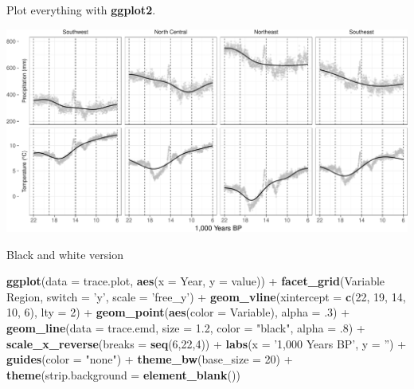 \documentclass[11pt,]{tufte-handout}
\newenvironment{Shaded}{}{}
\newcommand{\KeywordTok}[1]{\textcolor[rgb]{0.00,0.44,0.13}{\textbf{{#1}}}}
\newcommand{\DataTypeTok}[1]{\textcolor[rgb]{0.56,0.13,0.00}{{#1}}}
\newcommand{\DecValTok}[1]{\textcolor[rgb]{0.25,0.63,0.44}{{#1}}}
\newcommand{\FloatTok}[1]{\textcolor[rgb]{0.25,0.63,0.44}{{#1}}}
\newcommand{\StringTok}[1]{\textcolor[rgb]{0.25,0.44,0.63}{{#1}}}
\newcommand{\NormalTok}[1]{{#1}}
\begin{document}
Plot everything with \textbf{ggplot2}.

\begin{marginfigure}
\includegraphics{climate-analysis_files/figure-latex/bwplot-1} \caption[Black and white version]{Black and white version}\label{fig:bwplot}
\end{marginfigure}

\begin{Shaded}
\begin{Highlighting}[]
\KeywordTok{ggplot}\NormalTok{(}\DataTypeTok{data =} \NormalTok{trace.plot, }\KeywordTok{aes}\NormalTok{(}\DataTypeTok{x =} \NormalTok{Year, }\DataTypeTok{y =} \NormalTok{value)) +}
\StringTok{  }\KeywordTok{facet_grid}\NormalTok{(Variable ~}\StringTok{ }\NormalTok{Region, }\DataTypeTok{switch =} \StringTok{'y'}\NormalTok{, }\DataTypeTok{scale =} \StringTok{'free_y'}\NormalTok{) +}
\StringTok{  }\KeywordTok{geom_vline}\NormalTok{(}\DataTypeTok{xintercept =} \KeywordTok{c}\NormalTok{(}\DecValTok{22}\NormalTok{, }\DecValTok{19}\NormalTok{, }\DecValTok{14}\NormalTok{, }\DecValTok{10}\NormalTok{, }\DecValTok{6}\NormalTok{), }\DataTypeTok{lty =} \DecValTok{2}\NormalTok{) +}
\StringTok{  }\KeywordTok{geom_point}\NormalTok{(}\KeywordTok{aes}\NormalTok{(}\DataTypeTok{color =} \NormalTok{Variable), }\DataTypeTok{alpha =} \NormalTok{.}\DecValTok{3}\NormalTok{) +}
\StringTok{  }\KeywordTok{geom_line}\NormalTok{(}\DataTypeTok{data =} \NormalTok{trace.emd, }\DataTypeTok{size =} \FloatTok{1.2}\NormalTok{, }\DataTypeTok{color =} \StringTok{"black"}\NormalTok{, }\DataTypeTok{alpha =} \NormalTok{.}\DecValTok{8}\NormalTok{) +}
\StringTok{  }\KeywordTok{scale_x_reverse}\NormalTok{(}\DataTypeTok{breaks =} \KeywordTok{seq}\NormalTok{(}\DecValTok{6}\NormalTok{,}\DecValTok{22}\NormalTok{,}\DecValTok{4}\NormalTok{)) +}
\StringTok{  }\KeywordTok{labs}\NormalTok{(}\DataTypeTok{x =} \StringTok{'1,000 Years BP'}\NormalTok{, }\DataTypeTok{y =} \StringTok{''}\NormalTok{) +}
\StringTok{  }\KeywordTok{guides}\NormalTok{(}\DataTypeTok{color =} \StringTok{"none"}\NormalTok{) +}
\StringTok{  }\KeywordTok{theme_bw}\NormalTok{(}\DataTypeTok{base_size =} \DecValTok{20}\NormalTok{) +}
\StringTok{  }\KeywordTok{theme}\NormalTok{(}\DataTypeTok{strip.background  =} \KeywordTok{element_blank}\NormalTok{())}
\end{Highlighting}
\end{Shaded}
\end{document}
